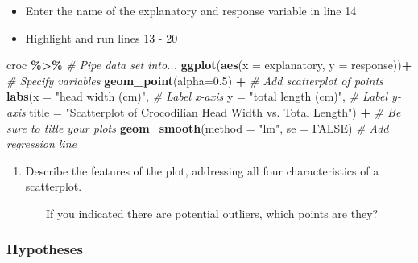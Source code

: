 \documentclass[
]{report}
\newenvironment{Shaded}{\begin{snugshade}}{\end{snugshade}}
\newcommand{\AttributeTok}[1]{\textcolor[rgb]{0.13,0.29,0.53}{#1}}
\newcommand{\CommentTok}[1]{\textcolor[rgb]{0.56,0.35,0.01}{\textit{#1}}}
\newcommand{\ConstantTok}[1]{\textcolor[rgb]{0.56,0.35,0.01}{#1}}
\newcommand{\FloatTok}[1]{\textcolor[rgb]{0.00,0.00,0.81}{#1}}
\newcommand{\FunctionTok}[1]{\textcolor[rgb]{0.13,0.29,0.53}{\textbf{#1}}}
\newcommand{\NormalTok}[1]{#1}
\newcommand{\SpecialCharTok}[1]{\textcolor[rgb]{0.81,0.36,0.00}{\textbf{#1}}}
\newcommand{\StringTok}[1]{\textcolor[rgb]{0.31,0.60,0.02}{#1}}
\providecommand{\tightlist}{%
  \setlength{\itemsep}{0pt}\setlength{\parskip}{0pt}}
\begin{document}
\begin{itemize}
\item
  Enter the name of the explanatory and response variable in line 14
\item
  Highlight and run lines 13 - 20
\end{itemize}

\newpage

\begin{Shaded}
\begin{Highlighting}[]
\NormalTok{croc }\SpecialCharTok{\%\textgreater{}\%} \CommentTok{\# Pipe data set into...}
\FunctionTok{ggplot}\NormalTok{(}\FunctionTok{aes}\NormalTok{(}\AttributeTok{x =}\NormalTok{ explanatory, }\AttributeTok{y =}\NormalTok{ response))}\SpecialCharTok{+}  \CommentTok{\# Specify variables}
  \FunctionTok{geom\_point}\NormalTok{(}\AttributeTok{alpha=}\FloatTok{0.5}\NormalTok{) }\SpecialCharTok{+}  \CommentTok{\# Add scatterplot of points}
  \FunctionTok{labs}\NormalTok{(}\AttributeTok{x =} \StringTok{"head width (cm)"}\NormalTok{,  }\CommentTok{\# Label x{-}axis}
       \AttributeTok{y =} \StringTok{"total length (cm)"}\NormalTok{,  }\CommentTok{\# Label y{-}axis}
       \AttributeTok{title =} \StringTok{"Scatterplot of Crocodilian Head Width vs. Total Length"}\NormalTok{) }\SpecialCharTok{+} 
    \CommentTok{\# Be sure to title your plots}
  \FunctionTok{geom\_smooth}\NormalTok{(}\AttributeTok{method =} \StringTok{"lm"}\NormalTok{, }\AttributeTok{se =} \ConstantTok{FALSE}\NormalTok{)  }\CommentTok{\# Add regression line}
\end{Highlighting}
\end{Shaded}

\begin{enumerate}
\def\labelenumi{\arabic{enumi}.}
\tightlist
\item
  Describe the features of the plot, addressing all four characteristics of a scatterplot.
\end{enumerate}

\vspace{1.2in}

~~~~~~~If you indicated there are potential outliers, which points are they?

\vspace{0.5in}

\subsubsection*{Hypotheses}\label{hypotheses-3}
\end{document}
